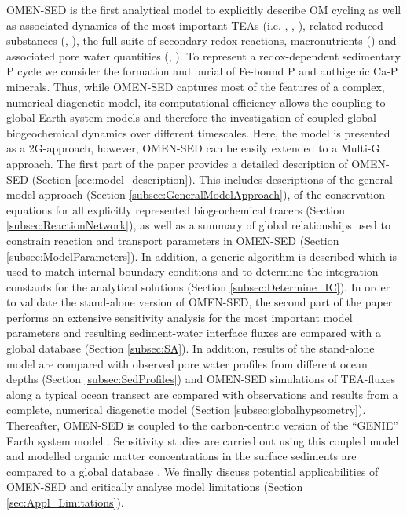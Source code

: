 \documentclass[gmd, manuscript]{copernicus}
\begin{document}
OMEN-SED is the first analytical model to explicitly describe OM cycling as well as associated dynamics of the most important TEAs 
(i.e. , , ), related reduced substances (, ), the full suite of secondary-redox reactions, macronutrients () and associated pore water quantities (, ). 
To represent a redox-dependent sedimentary P cycle we consider the formation and burial of Fe-bound P and authigenic Ca-P minerals. %
Thus, while OMEN-SED captures most of the features of a complex, numerical diagenetic model, its computational efficiency allows the coupling to global Earth system models and therefore the investigation of coupled global biogeochemical 
dynamics over different timescales. 
Here, the model is presented as a 2G-approach, however, OMEN-SED can be easily extended to a Multi-G approach. 
The first part of the paper provides a detailed description of OMEN-SED (Section \ref{sec:model_description}). This includes descriptions of the general model approach (Section \ref{subsec:GeneralModelApproach}), 
of the conservation equations for all explicitly represented biogeochemical tracers (Section \ref{subsec:ReactionNetwork}), as well as a summary of global relationships 
used to constrain reaction and transport parameters in OMEN-SED (Section \ref{subsec:ModelParameters}). 
In addition, a generic algorithm is described which is used to match internal boundary conditions and to determine the integration constants for the analytical solutions 
(Section \ref{subsec:Determine_IC}). 
In order to validate the stand-alone version of OMEN-SED, the second part of the paper performs an extensive sensitivity analysis for the most important model parameters and 
resulting sediment-water interface fluxes are compared with a global database (Section \ref{subsec:SA}). 
In addition, results of the stand-alone model are compared with observed pore water profiles from different ocean depths (Section \ref{subsec:SedProfiles}) and OMEN-SED 
simulations of TEA-fluxes along a typical ocean transect are compared with observations and results from a complete, numerical diagenetic model (Section \ref{subsec:globalhypsometry}). 
Thereafter, OMEN-SED is coupled to the carbon-centric version of the ``GENIE'' Earth system model \citep[cGENIE,][Section \ref{subsubsec:Methods_ESM_coupling}]{ridgwell_marine_2007}. 
Sensitivity studies are carried out using this coupled model and modelled organic matter concentrations in the surface sediments are compared to a global database \citep[][Section \ref{subsec:Parameterising_OM_rate_const}]{seiter_organic_2004}. 
We finally discuss potential applicabilities of OMEN-SED and critically analyse model limitations (Section \ref{sec:Appl_Limitations}).
\end{document}

